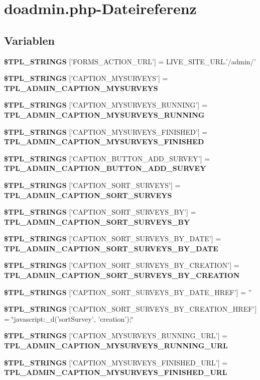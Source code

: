 \section{doadmin.php-Dateireferenz}
\label{doadmin_8php}
\subsection*{Variablen}
\begin{CompactItemize}
\item 
{\bf \$TPL\_\-STRINGS} ['FORMS\_\-ACTION\_\-URL'] = LIVE\_\-SITE\_\-URL.'/admin/'
\item 
{\bf \$TPL\_\-STRINGS} ['CAPTION\_\-MYSURVEYS'] = {\bf TPL\_\-ADMIN\_\-CAPTION\_\-MYSURVEYS}
\item 
{\bf \$TPL\_\-STRINGS} ['CAPTION\_\-MYSURVEYS\_\-RUNNING'] = {\bf TPL\_\-ADMIN\_\-CAPTION\_\-MYSURVEYS\_\-RUNNING}
\item 
{\bf \$TPL\_\-STRINGS} ['CAPTION\_\-MYSURVEYS\_\-FINISHED'] = {\bf TPL\_\-ADMIN\_\-CAPTION\_\-MYSURVEYS\_\-FINISHED}
\item 
{\bf \$TPL\_\-STRINGS} ['CAPTION\_\-BUTTON\_\-ADD\_\-SURVEY'] = {\bf TPL\_\-ADMIN\_\-CAPTION\_\-BUTTON\_\-ADD\_\-SURVEY}
\item 
{\bf \$TPL\_\-STRINGS} ['CAPTION\_\-SORT\_\-SURVEYS'] = {\bf TPL\_\-ADMIN\_\-CAPTION\_\-SORT\_\-SURVEYS}
\item 
{\bf \$TPL\_\-STRINGS} ['CAPTION\_\-SORT\_\-SURVEYS\_\-BY'] = {\bf TPL\_\-ADMIN\_\-CAPTION\_\-SORT\_\-SURVEYS\_\-BY}
\item 
{\bf \$TPL\_\-STRINGS} ['CAPTION\_\-SORT\_\-SURVEYS\_\-BY\_\-DATE'] = {\bf TPL\_\-ADMIN\_\-CAPTION\_\-SORT\_\-SURVEYS\_\-BY\_\-DATE}
\item 
{\bf \$TPL\_\-STRINGS} ['CAPTION\_\-SORT\_\-SURVEYS\_\-BY\_\-CREATION'] = {\bf TPL\_\-ADMIN\_\-CAPTION\_\-SORT\_\-SURVEYS\_\-BY\_\-CREATION}
\item 
{\bf \$TPL\_\-STRINGS} ['CAPTION\_\-SORT\_\-SURVEYS\_\-BY\_\-DATE\_\-HREF'] = ''
\item 
{\bf \$TPL\_\-STRINGS} ['CAPTION\_\-SORT\_\-SURVEYS\_\-BY\_\-CREATION\_\-HREF'] = \char`\"{}javascript:\_\-d('sortSurvey', 'creation');\char`\"{}
\item 
{\bf \$TPL\_\-STRINGS} ['CAPTION\_\-MYSURVEYS\_\-RUNNING\_\-URL'] = {\bf TPL\_\-ADMIN\_\-CAPTION\_\-MYSURVEYS\_\-RUNNING\_\-URL}
\item 
{\bf \$TPL\_\-STRINGS} ['CAPTION\_\-MYSURVEYS\_\-FINISHED\_\-URL'] = {\bf TPL\_\-ADMIN\_\-CAPTION\_\-MYSURVEYS\_\-FINISHED\_\-URL}

\end{CompactItemize}
